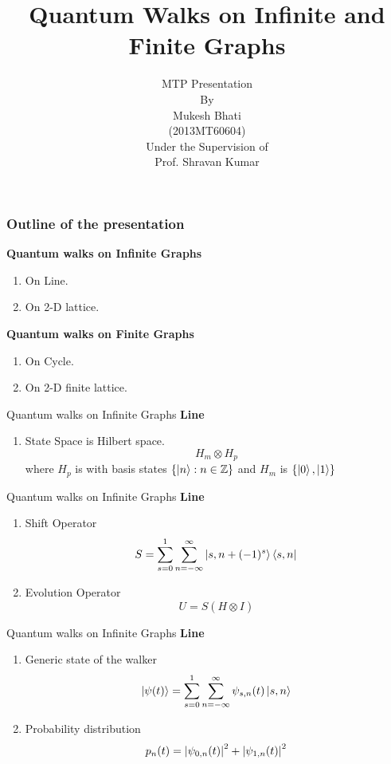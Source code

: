\documentclass[xcolor=svgnames]{beamer}
\title{Quantum Walks on Infinite and Finite Graphs }
\author[MTP Presentation]{MTP Presentation\\[0.5em]
{\scriptsize{By}}\\
[0.5em] Mukesh Bhati \\
(2013MT60604)\\
[0.5em]
{\scriptsize{Under the Supervision of }}\\
[0.5em] Prof. Shravan Kumar\\[2em]}
\institute[] {\scriptsize{Indian Institute of Technology\\  Delhi \\
[0.7em] }}
\date[February 22, 2018]{}
\newcommand{\tens}[1]{
  \mathbin{\mathop{\otimes}\limits_{#1}}}
\begin{document}
\frame{\titlepage}


\begin{frame}
\frametitle{Outline of the presentation}
\textbf{Quantum walks on Infinite Graphs}\\
\begin{itemsize}
\begin{enumerate}
    \item On Line.
    \item On 2-D lattice.
\end{enumerate}
\end{itemsize}
\textbf{Quantum walks on Finite Graphs}\\
\begin{itemsize}
\begin{enumerate}
    \item On Cycle.
    \item On 2-D finite lattice.
\end{enumerate}
\end{itemsize}
\end{frame}

\begin{frame}{Quantum walks on Infinite Graphs }
\textbf{Line}
\begin{enumerate}
    \item State Space is Hilbert space. $$H_m \tens{} H_p$$ where $H_p$ is with basis states $\{\ket{n} : n \in \mathbb{Z}\}$ and $H_m$ is $\{\ket{0},\ket{1}\}$
    
\end{enumerate}
    
\end{frame}

\begin{frame}{Quantum walks on Infinite Graphs }
\textbf{Line}
\begin{enumerate}
    \item Shift Operator
    $$ S = \sum_{s=0}^{1}\sum_{n = -\infty}^{\infty} \ket{s,n+(-1)^s}\bra{s,n}$$
    \item Evolution Operator $$ U = S(H \tens{} I)$$
\end{enumerate}
\end{frame}

\begin{frame}{Quantum walks on Infinite Graphs }
\textbf{Line}
\begin{enumerate}
    \item Generic state of the walker
    $$ \ket{\psi(t)} = \sum_{s=0}^{1}\sum_{n = -\infty}^{\infty} \psi_{s,n}(t)\ket{s,n}$$
    \item Probability distribution $$ p_{n}(t) = \abs{\psi_{0,n}(t)}^2 + \abs{\psi_{1,n}(t)}^2$$
\end{enumerate}
\end{frame}
\end{document}

